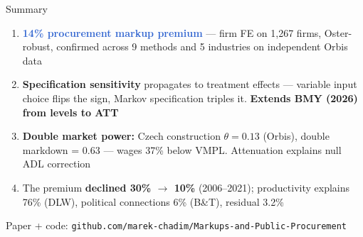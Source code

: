 \documentclass[aspectratio=169,11pt]{beamer}
\newcommand{\accenttext}[1]{\textcolor{accent}{\textbf{#1}}}
\newcommand{\highlighttext}[1]{\textcolor{highlight}{\textbf{#1}}}
\begin{document}
\begin{frame}{Summary}

\begin{enumerate}
    \item \highlighttext{14\% procurement markup premium} --- firm FE on 1,267 firms, Oster-robust, confirmed across 9 methods and 5 industries on independent Orbis data

    \medskip

    \item \textbf{Specification sensitivity} propagates to treatment effects --- variable input choice flips the sign, Markov specification triples it. \accenttext{Extends BMY (2026) from levels to ATT}

    \medskip

    \item \textbf{Double market power:} Czech construction $\theta = 0.13$ (Orbis), double markdown = 0.63 --- wages 37\% below VMPL. Attenuation explains null ADL correction

    \medskip

    \item The premium \textbf{declined 30\% $\rightarrow$ 10\%} (2006--2021); productivity explains 76\% (DLW), political connections 6\% (B\&T), residual 3.2\%
\end{enumerate}

\bigskip

\begin{center}
\textcolor{muted}{Paper + code: \texttt{github.com/marek-chadim/Markups-and-Public-Procurement}}
\end{center}

\end{frame}

\appendix
\end{document}
